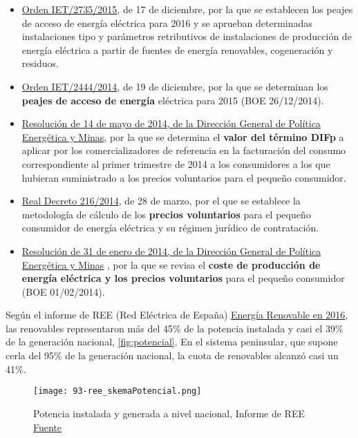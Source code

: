 \begin{itemize}
\item
  \href{https://www.boe.es/diario_boe/txt.php?id=BOE-A-2015-13782}{Orden
  IET/2735/2015}, de 17 de diciembre, por la que se establecen los
  peajes de acceso de energía eléctrica para 2016 y se aprueban
  determinadas instalaciones tipo y parámetros retributivos de
  instalaciones de producción de energía eléctrica a partir de fuentes
  de energía renovables, cogeneración y residuos.
\item
  \href{http://www.boe.es/diario_boe/txt.php?id=BOE-A-2014-13475}{Orden
  IET/2444/2014}, de 19 de diciembre, por la que se determinan los
  \textbf{peajes de acceso de energía} eléctrica para 2015 (BOE
  26/12/2014).
\item
  \href{https://www.boe.es/diario_boe/txt.php?id=BOE-A-2014-5173}{Resolución
  de 14 de mayo de 2014, de la Dirección General de Política Energética
  y Minas}, por la que se determina el \textbf{valor del término DIFp} a
  aplicar por los comercializadores de referencia en la facturación del
  consumo correspondiente al primer trimestre de 2014 a los consumidores
  a los que hubieran suministrado a los precios voluntarios para el
  pequeño consumidor.
\item
  \href{http://www.boe.es/diario_boe/txt.php?id=BOE-A-2014-3376}{Real
  Decreto 216/2014}, de 28 de marzo, por el que se establece la
  metodología de cálculo de los \textbf{precios voluntarios} para el
  pequeño consumidor de energía eléctrica y su régimen jurídico de
  contratación.
\item
  \href{http://www.boe.es/diario_boe/txt.php?id=BOE-A-2014-1053}{Resolución
  de 31 de enero de 2014, de la Dirección General de Política Energética
  y Minas} , por la que se revisa el \textbf{coste de producción de
  energía eléctrica y los precios voluntarios} para el pequeño
  consumidor (BOE 01/02/2014).
\end{itemize}

Según el informe de REE (Red Eléctrica de España)
\href{http://www.ree.es/es/estadisticas-del-sistema-electrico-espanol/informe-de-energias-renovables}{Energía
Renovable en 2016}, las renovables representaron más del 45\% de la
potencia instalada y casi el 39\% de la generación nacional, \autoref{fig:potencial}. En el
sistema peninsular, que supone cerla del 95\% de la generación nacional,
la cuota de renovables alcanzó casi un 41\%.

\begin{figure}
\centering
\texttt{[image: 93-ree\_skemaPotencial.png]}
\caption[Potencia instalada y generada a nivel nacional]{Potencia instalada y generada a nivel nacional, Informe de REE \href{http://www.ree.es/es/estadisticas-del-sistema-electrico-espanol/informe-de-energias-renovables}{Fuente}}
\label{fig:potencial}
\end{figure}

